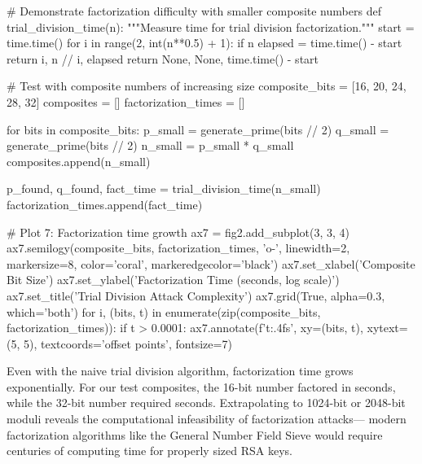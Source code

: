 \documentclass[a4paper, 11pt]{article}
\begin{document}
\begin{pycode}
# Demonstrate factorization difficulty with smaller composite numbers
def trial_division_time(n):
    """Measure time for trial division factorization."""
    start = time.time()
    for i in range(2, int(n**0.5) + 1):
        if n %
            elapsed = time.time() - start
            return i, n // i, elapsed
    return None, None, time.time() - start

# Test with composite numbers of increasing size
composite_bits = [16, 20, 24, 28, 32]
composites = []
factorization_times = []

for bits in composite_bits:
    p_small = generate_prime(bits // 2)
    q_small = generate_prime(bits // 2)
    n_small = p_small * q_small
    composites.append(n_small)

    p_found, q_found, fact_time = trial_division_time(n_small)
    factorization_times.append(fact_time)

# Plot 7: Factorization time growth
ax7 = fig2.add_subplot(3, 3, 4)
ax7.semilogy(composite_bits, factorization_times, 'o-', linewidth=2,
             markersize=8, color='coral', markeredgecolor='black')
ax7.set_xlabel('Composite Bit Size')
ax7.set_ylabel('Factorization Time (seconds, log scale)')
ax7.set_title('Trial Division Attack Complexity')
ax7.grid(True, alpha=0.3, which='both')
for i, (bits, t) in enumerate(zip(composite_bits, factorization_times)):
    if t > 0.0001:
        ax7.annotate(f'{t:.4f}s', xy=(bits, t), xytext=(5, 5),
                    textcoords='offset points', fontsize=7)
\end{pycode}

Even with the naive trial division algorithm, factorization time grows exponentially. For our
test composites, the 16-bit number factored in  seconds,
while the 32-bit number required  seconds. Extrapolating
to 1024-bit or 2048-bit moduli reveals the computational infeasibility of factorization attacks—
modern factorization algorithms like the General Number Field Sieve would require centuries of
computing time for properly sized RSA keys.
\end{document}
